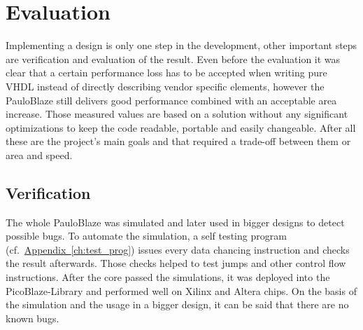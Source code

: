 \chapter{Evaluation}
\label{ch:res}
Implementing a design is only one step in the development, other important steps are verification and evaluation of the result.
Even before the evaluation it was clear that a certain performance loss has to be accepted when writing pure VHDL instead of directly describing vendor specific elements, however the PauloBlaze still delivers good performance combined with an acceptable area increase.
Those measured values are based on a solution without any significant optimizations to keep the code readable, portable and easily changeable.
After all these are the project's main goals and that required a trade-off between them or area and speed.


\section{Verification}
\label{sec:verifi}
The whole PauloBlaze was simulated and later used in bigger designs to detect possible bugs.
To automate the simulation, a self testing program (cf.~\hyperref[{ch:test_prog}]{Appendix~\ref*{ch:test_prog}}) issues every data chancing instruction and checks the result afterwards.
Those checks helped to test jumps and other control flow instructions.
After the core passed the simulations, it was deployed into the PicoBlaze-Library \cite{picoLib} and performed well on Xilinx and Altera chips.
On the basis of the simulation and the usage in a bigger design, it can be said that there are no known bugs.

